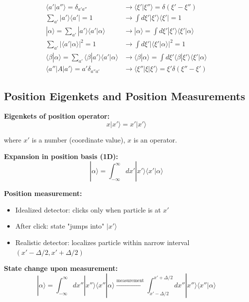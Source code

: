 \documentclass[11pt,a4paper]{article}
\begin{document}
\begin{align}
\langle a'|a''\rangle = \delta_{a'a''} &\to \langle\xi'|\xi''\rangle = \delta(\xi' - \xi'') \tag{1.184a} \\
\sum_{a'}|a'\rangle\langle a'| = 1 &\to \int d\xi'|\xi'\rangle\langle\xi'| = 1 \tag{1.184b} \\
|\alpha\rangle = \sum_{a'}|a'\rangle\langle a'|\alpha\rangle &\to |\alpha\rangle = \int d\xi'|\xi'\rangle\langle\xi'|\alpha\rangle \tag{1.184c} \\
\sum_{a'}|\langle a'|\alpha\rangle|^2 = 1 &\to \int d\xi'|\langle\xi'|\alpha\rangle|^2 = 1 \tag{1.184d} \\
\langle\beta|\alpha\rangle = \sum_{a'}\langle\beta|a'\rangle\langle a'|\alpha\rangle &\to \langle\beta|\alpha\rangle = \int d\xi'\langle\beta|\xi'\rangle\langle\xi'|\alpha\rangle \tag{1.184e} \\
\langle a''|A|a'\rangle = a'\delta_{a''a'} &\to \langle\xi''|\xi|\xi'\rangle = \xi'\delta(\xi'' - \xi') \tag{1.184f}
\end{align}

\subsection{Position Eigenkets and Position Measurements}

\textbf{Eigenkets of position operator:}
\begin{equation}
x|x'\rangle = x'|x'\rangle
\tag{1.185}
\end{equation}

where $x'$ is a number (coordinate value), $x$ is an operator.

\textbf{Expansion in position basis (1D):}
\begin{equation}
|\alpha\rangle = \int_{-\infty}^{\infty} dx'|x'\rangle\langle x'|\alpha\rangle
\tag{1.186}
\end{equation}

\textbf{Position measurement:}
\begin{itemize}
\item Idealized detector: clicks only when particle is at $x'$
\item After click: state "jumps into" $|x'\rangle$
\item Realistic detector: localizes particle within narrow interval $(x' - \Delta/2, x' + \Delta/2)$
\end{itemize}

\textbf{State change upon measurement:}
\begin{equation}
|\alpha\rangle = \int_{-\infty}^{\infty} dx''|x''\rangle\langle x''|\alpha\rangle \xrightarrow{\text{measurement}} \int_{x'-\Delta/2}^{x'+\Delta/2} dx''|x''\rangle\langle x''|\alpha\rangle
\tag{1.187}
\end{equation}
\end{document}
